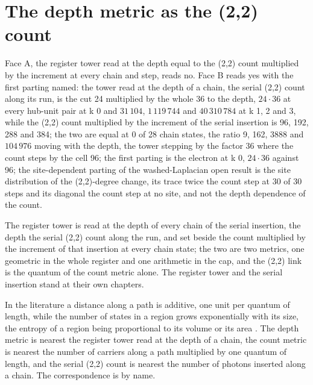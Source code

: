 \section{The depth metric as the (2,2) count}\label{mod:X-0-D542127-w-dmcn}
\begin{chwall}
Face A, the register tower read at the depth equal to the (2,2) count multiplied by the increment at every chain and step, reads no. Face B reads yes with the first parting named: the tower read at the depth of a chain, the serial (2,2) count along its run, is the cut 24 multiplied by the whole 36 to the depth, $24\cdot 36$ at every hub-unit pair at k 0 and $31\,104$, $1\,119\,744$ and $40\,310\,784$ at k 1, 2 and 3, while the (2,2) count multiplied by the increment of the serial insertion is 96, 192, 288 and 384; the two are equal at 0 of 28 chain states, the ratio 9, 162, 3888 and $104\,976$ moving with the depth, the tower stepping by the factor 36 where the count steps by the cell 96; the first parting is the electron at k 0, $24\cdot 36$ against 96; the site-dependent parting of the washed-Laplacian open result is the site distribution of the (2,2)-degree change, its trace twice the count step at 30 of 30 steps and its diagonal the count step at no site, and not the depth dependence of the count.
\end{chwall}
\chdeps{}{}
The register tower is read at the depth of every chain of the serial insertion, the depth the serial (2,2) count along the run, and set beside the count multiplied by the increment of that insertion at every chain state; the two are two metrics, one geometric in the whole register and one arithmetic in the cap, and the (2,2) link is the quantum of the count metric alone. The register tower and the serial insertion stand at their own chapters.
\begin{chbridge}
In the literature a distance along a path is additive, one unit per quantum of length, while the number of states in a region grows exponentially with its size, the entropy of a region being proportional to its volume or its area \cite{Wald1984,Bousso2002}. The depth metric is nearest the register tower read at the depth of a chain, the count metric is nearest the number of carriers along a path multiplied by one quantum of length, and the serial (2,2) count is nearest the number of photons inserted along a chain. The correspondence is by name.
\end{chbridge}
